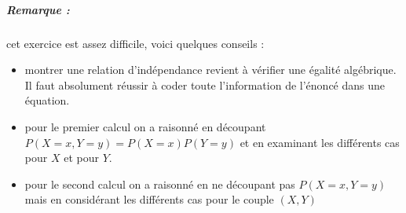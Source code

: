 \documentclass[10pt,a4paper]{article}
\begin{document}
\subparagraph{Remarque :} cet exercice est assez difficile, voici quelques conseils :
\begin{itemize}
\item montrer une relation d'indépendance revient à vérifier une égalité algébrique. Il faut absolument réussir à coder toute l'information de l'énoncé dans une équation.
\item pour le premier calcul on a raisonné en découpant $P(X=x,Y=y)=P(X=x)P(Y=y)$ et en examinant les différents cas pour $X$ et pour $Y$.
\item pour le second calcul on a raisonné en ne découpant pas $P(X=x,Y=y)$ mais en considérant les différents cas pour le couple $(X,Y)$
\end{itemize}
\end{document}
